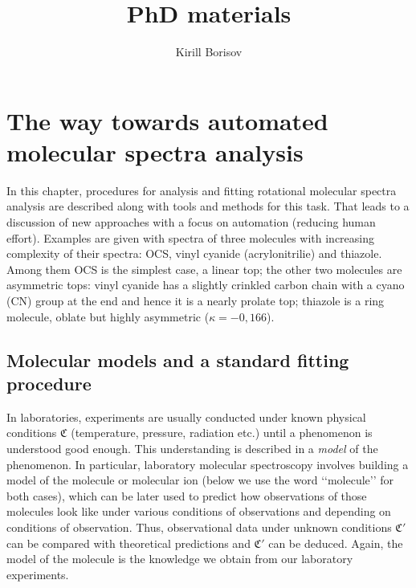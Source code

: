 \documentclass[11pt]{article}
\title{PhD materials}
\author{Kirill Borisov}
\begin{document}
\begin{titlepage}
\maketitle
\end{titlepage}

\tableofcontents
\newpage

%
%

\section{The way towards automated molecular spectra analysis}

In this chapter, procedures for analysis and fitting rotational molecular spectra analysis are described along with tools and methods for this task. That leads to a discussion of new approaches with a focus on automation (reducing human effort). Examples are given with spectra of three molecules with increasing complexity of their spectra: OCS, vinyl cyanide (acrylonitrilie) and thiazole. Among them OCS is the simplest case, a linear top; the other two molecules are asymmetric tops: vinyl cyanide has a slightly crinkled carbon chain with a cyano (CN) group at the end and hence it is a nearly prolate top; thiazole is a ring molecule, oblate but highly asymmetric ($\kappa=-0,166$).    

\subsection{Molecular models and a standard fitting procedure}

In laboratories, experiments are usually conducted under known physical conditions $\mathfrak{C}$ (temperature, pressure, radiation etc.) until a phenomenon is understood good enough. This understanding is described in a \emph{model} of the phenomenon. In particular, laboratory molecular spectroscopy involves building a model of the molecule or molecular ion (below we use the word \lq\lq{}molecule\rq\rq{} for both cases), which can be later used to predict how observations of those molecules look like under various conditions of observations and depending on conditions of observation. Thus, observational data under unknown conditions $\mathfrak{C}'$ can be compared with theoretical predictions and $\mathfrak{C}'$ can be deduced. Again, the model of the molecule is the knowledge we obtain from our laboratory experiments. 
\end{document}
